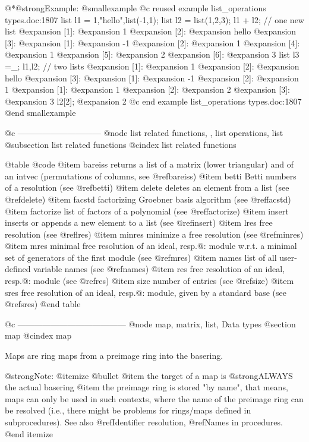 {{{{{{@*@strong{Example:}
@smallexample
@c reused example list_operations types.doc:1807 
  list l1 = 1,"hello",list(-1,1);
  list l2 = list(1,2,3);
  l1 + l2;          // one new list
@expansion{} [1]:
@expansion{}    1
@expansion{} [2]:
@expansion{}    hello
@expansion{} [3]:
@expansion{}    [1]:
@expansion{}       -1
@expansion{}    [2]:
@expansion{}       1
@expansion{} [4]:
@expansion{}    1
@expansion{} [5]:
@expansion{}    2
@expansion{} [6]:
@expansion{}    3
  list l3 =_;
  l1,l2;            // two lists
@expansion{} [1]:
@expansion{}    1
@expansion{} [2]:
@expansion{}    hello
@expansion{} [3]:
@expansion{}    [1]:
@expansion{}       -1
@expansion{}    [2]:
@expansion{}       1
@expansion{} [1]:
@expansion{}    1
@expansion{} [2]:
@expansion{}    2
@expansion{} [3]:
@expansion{}    3
  l2[2];
@expansion{} 2
@c end example list_operations types.doc:1807
@end smallexample

@c ------------------------------
@node list related functions,  , list operations, list
@subsection list related functions
@cindex list related functions

@table @code
@item bareiss
returns a list of a matrix (lower triangular) and
of an intvec (permutations of columns, see @ref{bareiss})
@item betti
Betti numbers of a resolution (see @ref{betti})
@item delete
deletes an element from a list (see @ref{delete})
@item facstd
factorizing Groebner basis algorithm (see @ref{facstd})
@item factorize
list of factors of a polynomial (see @ref{factorize})
@item insert
inserts or appends a new element to a list (see @ref{insert})
@item lres
free resolution (see @ref{lres})
@item minres
minimize a free resolution (see @ref{minres})
@item mres
minimal free resolution of an ideal, resp.@: module w.r.t.
a minimal set of generators of the first module (see @ref{mres})
@item names
list of all user-defined variable names (see @ref{names})
@item res
free resolution of an ideal, resp.@: module (see @ref{res})
@item size
number of entries (see @ref{size})
@item sres
free resolution of an ideal, resp.@: module, given by a standard base (see @ref{sres})
@end table


@c ---------------------------------------
@node map, matrix, list, Data types
@section map
@cindex map

Maps are ring maps from a preimage ring into the basering.

@strong{Note:}
@itemize @bullet
@item
the target of a map is @strong{ALWAYS} the actual basering
@item
the preimage ring is stored "by name", that means, maps can only be
used in such contexts, where the name of the preimage ring can be
resolved (i.e., there might be problems for rings/maps defined in
subprocedures). See also @ref{Identifier resolution}, @ref{Names in
procedures}.
@end itemize

}}}}}}
